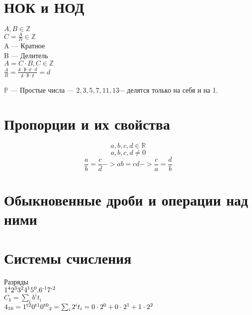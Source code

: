 \documentclass[a4paper, 12 pt]{article}
\begin{document}
\section{НОК и НОД}
\begin{flushleft}
	$A,B \in \mathbb{Z}$\\
	$C = \frac{A}{B} \in \mathbb{Z}$\\
	A --- Кратное\\
	B --- Делитель\\
	$A = C \cdot B, C \in \mathbb{Z}$\\
	$\frac{A}{B}=\frac{ \not a \cdot \not b \cdot \not c \cdot d}{\not a\cdot \not b \cdot \not c}=d$

	$\mathbb{P}$ --- Простые числа        --- $2,3,5,7,11,13 \cdots$ делятся только на себя и на 1.\\
\end{flushleft}

\section{Пропорции и их свойства}
\begin{flushleft}
	\[a,b,c,d \in \mathbb R\]
	\[a,b,c,d \neq 0\]
	\[\frac{a}{b}=\frac{c}{d} -> ab=cd -> \frac{c}{a}=\frac{d}{b}\]
\end{flushleft}

\section{Обыкновенные дроби и операции над ними}
\begin{flushleft}
\end{flushleft}

\section{Системы счисления}
\begin{flushleft}
	Разряды\\
	$ 1\textsuperscript{4}2\textsuperscript{3}3\textsuperscript{2}4\textsuperscript{1}5\textsuperscript{0}.6\textsuperscript{-1}7\textsuperscript{-2}$\\
	$C_b=\sum_{i}b^{i}t_{i}$\\
	$4_{10}=1\textsuperscript{t2}0\textsuperscript{t1}0\textsuperscript{t0}_2=\sum_{i}2^{i}t_i=0 \cdot 2\textsuperscript{0}+0\cdot 2\textsuperscript{1}+1 \cdot 2\textsuperscript{2}$\\
\end{flushleft}
\end{document}
